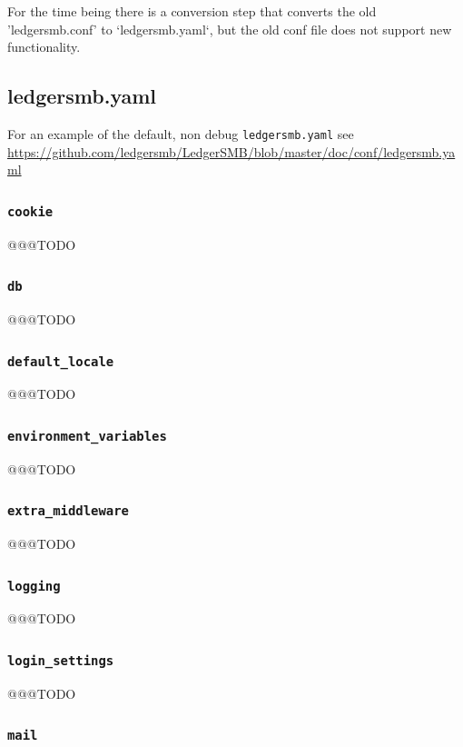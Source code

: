 For the time being there is a conversion step that converts the old 'ledgersmb.conf' to `ledgersmb.yaml`, but the old conf file does not support new functionality.

\subsection{ledgersmb.yaml}
\label{subsec-global-config-ledgersmb-yaml}

For an example of the default, non debug \texttt{ledgersmb.yaml}  see  \url{https://github.com/ledgersmb/LedgerSMB/blob/master/doc/conf/ledgersmb.yaml}

\subsubsection{\texttt{cookie}}
 @@@TODO

\subsubsection{\texttt{db}}
 @@@TODO

\subsubsection{\texttt{default\_locale}}
@@@TODO

\subsubsection{\texttt{environment\_variables}}
 @@@TODO

\subsubsection{\texttt{extra\_middleware}}
@@@TODO

\subsubsection{\texttt{logging}}
@@@TODO

\subsubsection{\texttt{login\_settings}}
@@@TODO

\subsubsection{\texttt{mail}}


